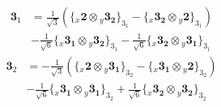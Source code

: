 \documentclass[english]{article}
\newcommand{\rep}[1]{\mathbf{#1}}
\newcommand{\repx}[2]{{}_{#2}\mathbf{#1}}
\newcommand{\tsprodx}[2]{\repx{#1}{x}\otimes\repx{#2}{y}}
\newcommand{\subcgs}[3]{\big\{ \tsprodx{#1}{#2}\big\}^{}_{#3}}
\begin{document}
\begin{itemize}
\begin{fleqn}
\begin{align*}
\rep{3}_{1} & = \frac{1}{\sqrt{3}}\left(\subcgs{2}{3_{2}}{3_{1}}-\subcgs{3_{2}}{2}{3_{1}}\right) \\ 
 & -\frac{1}{\sqrt{6}}\subcgs{3_{1}}{3_{2}}{3_{1}}-\frac{1}{\sqrt{6}}\subcgs{3_{2}}{3_{1}}{3_{1}}
\end{align*}
\begin{align*}
\rep{3}_{2} & = -\frac{1}{\sqrt{3}}\left(\subcgs{2}{3_{1}}{3_{2}}-\subcgs{3_{1}}{2}{3_{2}}\right) \\ 
 & -\frac{1}{\sqrt{6}}\subcgs{3_{1}}{3_{1}}{3_{2}}+\frac{1}{\sqrt{6}}\subcgs{3_{2}}{3_{2}}{3_{2}}
\end{align*}
\end{fleqn}
\end{itemize}
\end{document}
